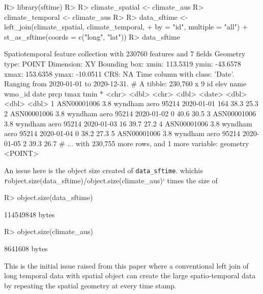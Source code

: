 \documentclass[
  shortnames]{jss}
\begin{document}
\begin{CodeChunk}
\begin{CodeInput}
R> library(sftime)
R> 
R> climate_spatial <- climate_aus %
R> climate_temporal <- climate_aus %
R> 
R> data_sftime <- left_join(climate_spatial, climate_temporal,  
+                          by = "id", multiple = "all") %
+   st_as_sftime(coords = c("long", "lat"))
R> data_sftime
\end{CodeInput}
\begin{CodeOutput}
Spatiotemporal feature collection with 230760 features and 7 fields
Geometry type: POINT
Dimension:     XY
Bounding box:  xmin: 113.5319 ymin: -43.6578 xmax: 153.6358 ymax: -10.0511
CRS:           NA
Time column with class: 'Date'.
Ranging from 2020-01-01 to 2020-12-31.
# A tibble: 230,760 x 9
  id           elev name         wmo_id date        prcp  tmax  tmin
* <chr>       <dbl> <chr>         <dbl> <date>     <dbl> <dbl> <dbl>
1 ASN00001006   3.8 wyndham aero  95214 2020-01-01   164  38.3  25.3
2 ASN00001006   3.8 wyndham aero  95214 2020-01-02     0  40.6  30.5
3 ASN00001006   3.8 wyndham aero  95214 2020-01-03    16  39.7  27.2
4 ASN00001006   3.8 wyndham aero  95214 2020-01-04     0  38.2  27.3
5 ASN00001006   3.8 wyndham aero  95214 2020-01-05     2  39.3  26.7
# ... with 230,755 more rows, and 1 more variable: geometry <POINT>
\end{CodeOutput}
\end{CodeChunk}

An issue here is the object size created of \texttt{data\_sftime}. whichis \texttt{r}object.size(data\_sftime)/object.size(climate\_aus)` times the size of 

\begin{CodeChunk}
\begin{CodeInput}
R> object.size(data_sftime)
\end{CodeInput}
\begin{CodeOutput}
114549848 bytes
\end{CodeOutput}
\begin{CodeInput}
R> object.size(climate_aus)
\end{CodeInput}
\begin{CodeOutput}
8641608 bytes
\end{CodeOutput}
\end{CodeChunk}

This is the initial issue raised from this paper where a conventional left join of long temporal data with spatial object can create the large spatio-temporal data by repeating the spatial geometry at every time stamp.
\end{document}

